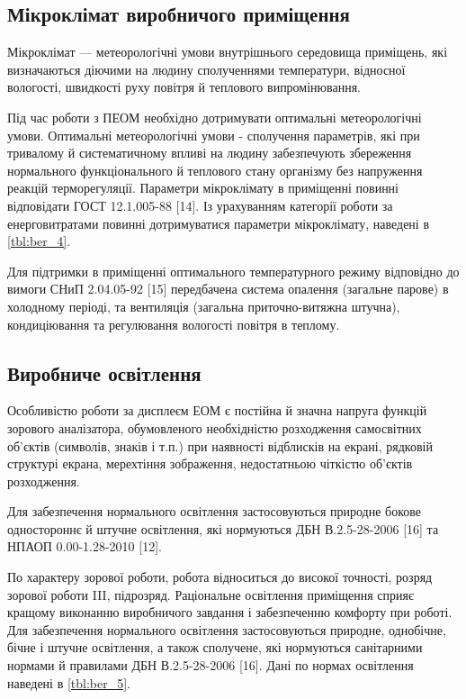 \subsection{Мікроклімат виробничого приміщення}
Мікроклімат --- метеорологічні умови внутрішнього середовища приміщень, які визначаються діючими на людину сполученнями температури, відносної вологості, швидкості руху повітря й теплового випромінювання.

Під час роботи з ПЕОМ необхідно дотримувати оптимальні метеорологічні умови. Оптимальні метеорологічні умови - сполучення параметрів, які при тривалому й систематичному впливі на людину забезпечують збереження нормального функціонального й теплового стану організму без напруження реакцій терморегуляції. Параметри  мікроклімату  в  приміщенні  повинні  відповідати ГОСТ 12.1.005-88 [14]. Із урахуванням категорії роботи за енерговитратами повинні дотримуватися параметри мікроклімату, наведені в \ref{tbl:ber_4}.

%
%

Для підтримки в приміщенні оптимального температурного режиму відповідно до вимоги СНиП 2.04.05-92 [15] передбачена система опалення (загальне парове) в холодному періоді, та вентиляція (загальна приточно-витяжна штучна), кондиціювання та регулювання вологості повітря в теплому.

\subsection{Виробниче освітлення}

Особливістю роботи за дисплеєм ЕОМ є постійна й значна напруга функцій зорового аналізатора, обумовленого необхідністю розходження самосвітних об'єктів (символів, знаків і т.п.) при наявності відблисків на екрані, рядковій структурі екрана, мерехтіння зображення, недостатньою чіткістю об'єктів розходження.

Для забезпечення нормального освітлення застосовуються природне бокове одностороннє й штучне освітлення, які нормуються ДБН В.2.5-28-2006 [16] та НПАОП 0.00-1.28-2010 [12].

По характеру зорової роботи, робота відноситься до високої точності, розряд зорової роботи III, підрозряд. Раціональне освітлення приміщення сприяє кращому виконанню виробничого завдання і забезпеченню комфорту при роботі. Для забезпечення нормального освітлення застосовуються природне, однобічне, бічне і штучне освітлення, а також сполучене, які нормуються санітарними нормами й правилами ДБН В.2.5-28-2006 [16]. Дані по нормах освітлення наведені в \ref{tbl:ber_5}.

